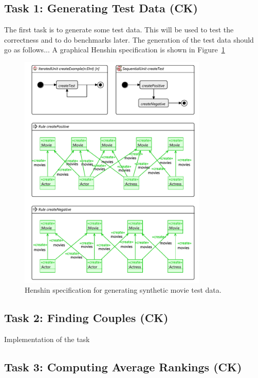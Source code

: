 \documentclass[a4paper]{article}
\begin{document}
\subsection{Task 1: Generating Test Data (CK)}
\label{sec:gen-test-data}

The first task is to generate some test data.
This will be used to test the correctness and to do benchmarks later.
The generation of the test data should go as follows...
A graphical Henshin specification is shown in Figure~\ref{fig:gen-test-data}

\begin{figure}[p]
\centering
\includegraphics[width=0.8\textwidth]{gen-test-data}
\caption{Henshin specification for generating synthetic movie test data.}
\label{fig:gen-test-data}
\end{figure}

\subsection{Task 2: Finding Couples (CK)}

Implementation of the task

\subsection{Task 3: Computing Average Rankings (CK)}
\end{document}
